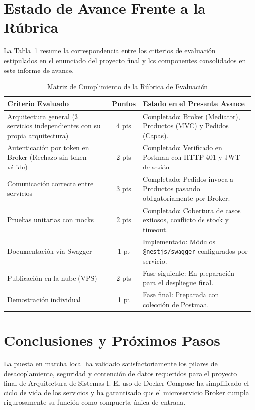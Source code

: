 \documentclass[conference]{IEEEtran}
\begin{document}
\section{Estado de Avance Frente a la Rúbrica}
La Tabla~\ref{tab:rubrica} resume la correspondencia entre los criterios de evaluación estipulados en el enunciado del proyecto final y los componentes consolidados en este informe de avance.

\begin{table}[htbp]
\caption{Matriz de Cumplimiento de la Rúbrica de Evaluación}
\begin{center}
\begin{tabular}{p{3.2cm}cp{3.8cm}}
\toprule
\textbf{Criterio Evaluado} & \textbf{Puntos} & \textbf{Estado en el Presente Avance} \\
\midrule
Arquitectura general (3 servicios independientes con su propia arquitectura) & 4 pts & Completado: Broker (Mediator), Productos (MVC) y Pedidos (Capas). \\
\midrule
Autenticación por token en Broker (Rechazo sin token válido) & 2 pts & Completado: Verificado en Postman con HTTP 401 y JWT de sesión. \\
\midrule
Comunicación correcta entre servicios & 3 pts & Completado: Pedidos invoca a Productos pasando obligatoriamente por Broker. \\
\midrule
Pruebas unitarias con mocks & 2 pts & Completado: Cobertura de casos exitosos, conflicto de stock y timeout. \\
\midrule
Documentación vía Swagger & 1 pt & Implementado: Módulos \texttt{@nestjs/swagger} configurados por servicio. \\
\midrule
Publicación en la nube (VPS) & 2 pts & Fase siguiente: En preparación para el despliegue final. \\
\midrule
Demostración individual & 1 pt & Fase final: Preparada con colección de Postman. \\
\bottomrule
\end{tabular}
\label{tab:rubrica}
\end{center}
\end{table}

\section{Conclusiones y Próximos Pasos}
La puesta en marcha local ha validado satisfactoriamente los pilares de desacoplamiento, seguridad y contención de datos requeridos para el proyecto final de Arquitectura de Sistemas I. El uso de Docker Compose ha simplificado el ciclo de vida de los servicios y ha garantizado que el microservicio Broker cumpla rigurosamente su función como compuerta única de entrada.
\end{document}
